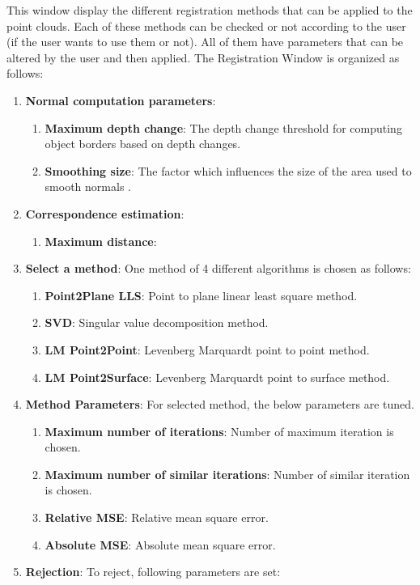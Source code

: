 \documentclass[aps,letterpaper,11pt]{revtex4}
\begin{document}
This window display the different registration methods that can be applied to the point clouds. Each of these methods can be checked or not according to the user (if the user wants to use them or not). All of them have parameters that can be altered by the user and then applied. The Registration Window is organized as follows:

\begin{enumerate}
  \item \textbf{Normal computation parameters}:
\begin{enumerate}
  \item \textbf{Maximum depth change}:  The depth change threshold for computing object borders based on depth changes.
  \item \textbf{Smoothing size}: The factor which influences the size of the area used to smooth normals .
\end{enumerate}
 \item \textbf{Correspondence estimation}:
\begin{enumerate}
 \item \textbf{Maximum distance}:
\end{enumerate}
 \item \textbf{Select a method}: One method of 4 different algorithms is chosen as follows:
\begin{enumerate}
 \item \textbf{Point2Plane LLS}: Point to plane linear least square method.
 \item \textbf{SVD}: Singular value decomposition method.
 \item \textbf{LM Point2Point}: Levenberg Marquardt point to point method.
\item \textbf{LM Point2Surface}: Levenberg Marquardt point to surface method.
\end{enumerate}
 \item \textbf{Method Parameters}: For selected method, the below parameters are tuned.
\begin{enumerate}
 \item \textbf{Maximum number of iterations}: Number of maximum iteration is chosen.
 \item \textbf{Maximum number of similar iterations}: Number of similar iteration is chosen.
 \item \textbf{Relative MSE}: Relative mean square error.
 \item \textbf{Absolute MSE}: Absolute mean square error.
\end{enumerate}
 \item \textbf{Rejection}: To reject, following parameters are set:

\end{enumerate}
\end{document}
